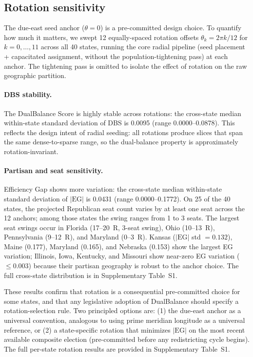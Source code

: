 \subsection{Rotation sensitivity}
\label{sec:results-rotation}

The due-east seed anchor ($\theta = 0$) is a pre-committed design
choice. To quantify how much it matters, we swept 12 equally-spaced
rotation offsets $\theta_k = 2\pi k / 12$ for $k = 0, \ldots, 11$
across all 40 states, running the core radial pipeline (seed
placement + capacitated assignment, without the population-tightening
pass) at each anchor. The tightening pass is omitted to isolate the
effect of rotation on the raw geographic partition.

\paragraph{DBS stability.}
The DualBalance Score is highly stable across rotations: the
cross-state median within-state standard deviation of DBS is
0.0095 (range 0.0000--0.0878).
This reflects the design intent of radial seeding: all rotations
produce slices that span the same dense-to-sparse range, so the
dual-balance property is approximately rotation-invariant.

\paragraph{Partisan and seat sensitivity.}
Efficiency Gap shows more variation: the cross-state median
within-state standard deviation of $|\mathrm{EG}|$ is
0.0431 (range 0.0000--0.1772).
On 25 of the 40 states, the projected Republican seat count
varies by at least one seat across the 12 anchors; among those
states the swing ranges from 1 to 3 seats. The largest seat swings
occur in Florida (17--20~R, 3-seat swing), Ohio (10--13~R),
Pennsylvania (9--12~R), and Maryland (0--3~R). Kansas
($|\mathrm{EG}|$ std $= 0.132$), Maine (0.177), Maryland (0.165),
and Nebraska (0.153) show the largest EG variation;
Illinois, Iowa, Kentucky, and Missouri show near-zero EG variation
($\leq 0.003$) because their partisan geography is robust to
the anchor choice.
The full cross-state distribution is in Supplementary Table~S1.

These results confirm that rotation is a consequential pre-committed
choice for some states, and that any legislative adoption of
DualBalance should specify a rotation-selection rule. Two principled
options are: (1) the due-east anchor as a universal convention,
analogous to using prime meridian longitude as a universal reference,
or (2) a state-specific rotation that minimizes $|\mathrm{EG}|$ on
the most recent available composite election (pre-committed before
any redistricting cycle begins). The full per-state rotation results
are provided in Supplementary Table~S1.

